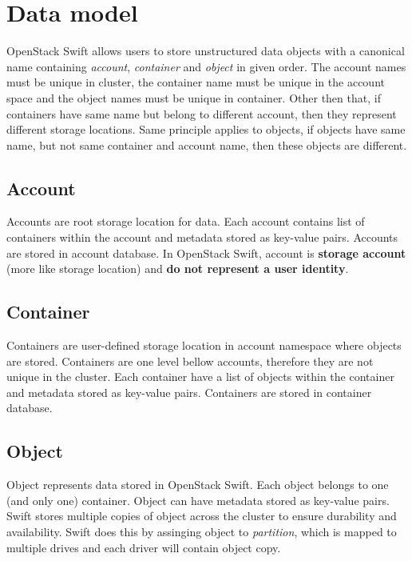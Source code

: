     \section{Data model}
    OpenStack Swift allows users to store unstructured data objects with a canonical name containing \textit{account}, \textit{container} and \textit{object} in given order\cite{swiftOpenStackSwift}. The account names must be unique in cluster, the container name must be unique in the account space and the object names must be unique in container. Other then that, if containers have same name but belong to different account, then they represent different storage locations. Same principle applies to objects, if objects have same name, but not same container and account name, then these objects are different.

    \subsection{Account}
    Accounts are root storage location for data. Each account contains list of containers within the account and metadata stored as key-value pairs. Accounts are stored in account database. In OpenStack Swift, account is \textbf{storage account} (more like storage location) and \textbf{do not represent a user identity}\cite{swiftOpenStackSwift}.

    \subsection{Container}
    Containers are user-defined storage location in account namespace where objects are stored. Containers are one level bellow accounts, therefore they are not unique in the cluster. Each container have a list of objects within the container and metadata stored as key-value pairs. Containers are stored in container database\cite{swiftOpenStackSwift}.

    \subsection{Object}
    Object represents data stored in OpenStack Swift. Each object belongs to one (and only one) container. Object can have metadata stored as key-value pairs. Swift stores multiple copies of object across the cluster to ensure durability and availability. Swift does this by assinging object to \textit{partition}, which is mapped to multiple drives and each driver will contain object copy\cite{swiftOpenStackSwift}.

